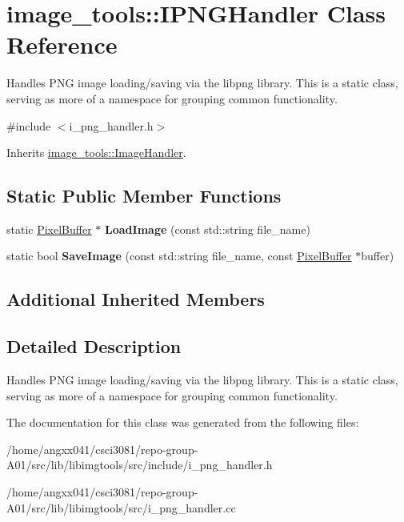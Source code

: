 \hypertarget{classimage__tools_1_1IPNGHandler}{}\section{image\+\_\+tools\+:\+:I\+P\+N\+G\+Handler Class Reference}
\label{classimage__tools_1_1IPNGHandler}


Handles P\+NG image loading/saving via the libpng library. This is a static class, serving as more of a namespace for grouping common functionality.  




{\ttfamily \#include $<$i\+\_\+png\+\_\+handler.\+h$>$}



Inherits \hyperlink{classimage__tools_1_1ImageHandler}{image\+\_\+tools\+::\+Image\+Handler}.

\subsection*{Static Public Member Functions}
\begin{DoxyCompactItemize}
\item 
static \hyperlink{classimage__tools_1_1PixelBuffer}{Pixel\+Buffer} $\ast$ {\bfseries Load\+Image} (const std\+::string file\+\_\+name)\hypertarget{classimage__tools_1_1IPNGHandler_a9ba654404b6584117fd03a260826c29b}{}\label{classimage__tools_1_1IPNGHandler_a9ba654404b6584117fd03a260826c29b}

\item 
static bool {\bfseries Save\+Image} (const std\+::string file\+\_\+name, const \hyperlink{classimage__tools_1_1PixelBuffer}{Pixel\+Buffer} $\ast$buffer)\hypertarget{classimage__tools_1_1IPNGHandler_ad69a60ad7d6f971d2b39c9cbb1e338c7}{}\label{classimage__tools_1_1IPNGHandler_ad69a60ad7d6f971d2b39c9cbb1e338c7}

\end{DoxyCompactItemize}
\subsection*{Additional Inherited Members}


\subsection{Detailed Description}
Handles P\+NG image loading/saving via the libpng library. This is a static class, serving as more of a namespace for grouping common functionality. 

The documentation for this class was generated from the following files\+:\begin{DoxyCompactItemize}
\item 
/home/angxx041/csci3081/repo-\/group-\/\+A01/src/lib/libimgtools/src/include/i\+\_\+png\+\_\+handler.\+h\item 
/home/angxx041/csci3081/repo-\/group-\/\+A01/src/lib/libimgtools/src/i\+\_\+png\+\_\+handler.\+cc\end{DoxyCompactItemize}
